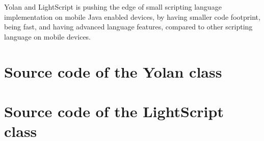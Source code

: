 \documentclass[11pt]{report}
\begin{document}
Yolan and LightScript is pushing the edge of small scripting language implementation on mobile Java enabled devices, by having smaller code footprint, being fast, and having advanced language features, compared to other scripting language on mobile devices.





%
%

\newpage
{}



\appendix

%

\chapter{Source code of the Yolan class}


\chapter{Source code of the LightScript class}



\newpage
{}
\printindex
\end{document}
